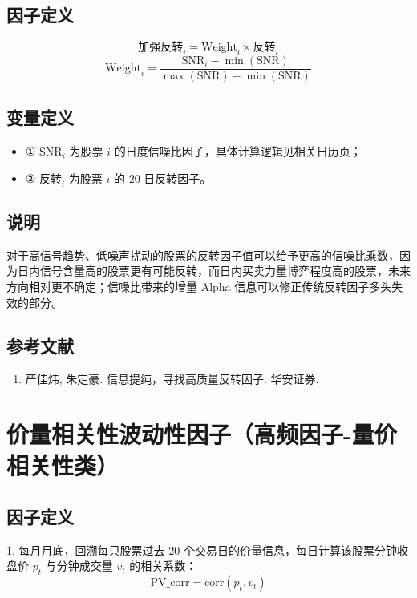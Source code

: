 \documentclass{article}
\begin{document}
\subsection{因子定义}
\begin{equation}
    \text{加强反转}_i = \mathrm{Weight}_i \times \text{反转}_i
\end{equation}
\begin{equation}
    \mathrm{Weight}_i = \frac{\mathrm{SNR}_i - \min(\mathrm{SNR})}{\max(\mathrm{SNR}) - \min(\mathrm{SNR})}
\end{equation}

\subsection{变量定义}
\begin{itemize}
    \item ① \( \mathrm{SNR}_i \) 为股票 \( i \) 的日度信噪比因子，具体计算逻辑见相关日历页；
    \item ② \( \text{反转}_i \) 为股票 \( i \) 的 20 日反转因子。
\end{itemize}

\subsection{说明}
对于高信号趋势、低噪声扰动的股票的反转因子值可以给予更高的信噪比乘数，因为日内信号含量高的股票更有可能反转，而日内买卖力量博弈程度高的股票，未来方向相对更不确定；信噪比带来的增量 Alpha 信息可以修正传统反转因子多头失效的部分。

\subsection{参考文献}
\begin{enumerate}
    \item 严佳炜, 朱定豪. 信息提纯，寻找高质量反转因子. 华安证券.
\end{enumerate}

\section{价量相关性波动性因子（高频因子-量价相关性类）}

\subsection{因子定义}

1. 每月月底，回溯每只股票过去 20 个交易日的价量信息，每日计算该股票分钟收盘价 \( p_t \) 与分钟成交量 \( v_t \) 的相关系数：
\begin{equation}
    \mathrm{PV\_corr} = \mathrm{corr}(p_t, v_t)
\end{equation}
\end{document}
